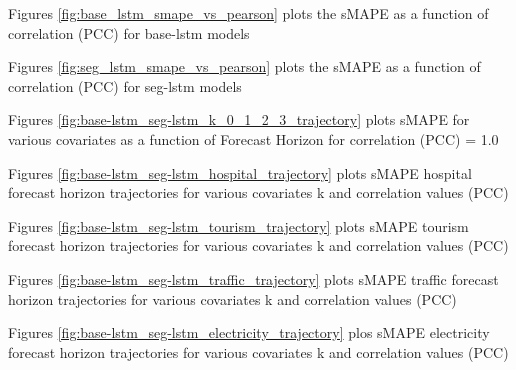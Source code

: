 \documentclass[letterpaper]{article}
\begin{document}
Figures \ref{fig:base_lstm_smape_vs_pearson} plots the sMAPE as a function of correlation (PCC) for base-lstm models

Figures \ref{fig:seg_lstm_smape_vs_pearson} plots the sMAPE as a function of correlation (PCC) for seg-lstm models

Figures \ref{fig:base-lstm_seg-lstm_k_0_1_2_3_trajectory} plots sMAPE for various covariates as a function of Forecast Horizon for correlation (PCC) = 1.0

Figures \ref{fig:base-lstm_seg-lstm_hospital_trajectory} plots sMAPE hospital forecast horizon trajectories for various covariates k and correlation values (PCC)

Figures \ref{fig:base-lstm_seg-lstm_tourism_trajectory} plots sMAPE tourism forecast horizon trajectories for various covariates k and correlation values (PCC)

Figures \ref{fig:base-lstm_seg-lstm_traffic_trajectory} plots sMAPE traffic forecast horizon trajectories for various covariates k and correlation values (PCC)

Figures \ref{fig:base-lstm_seg-lstm_electricity_trajectory} plos sMAPE electricity forecast horizon trajectories for various covariates k and correlation values (PCC)
\end{document}
